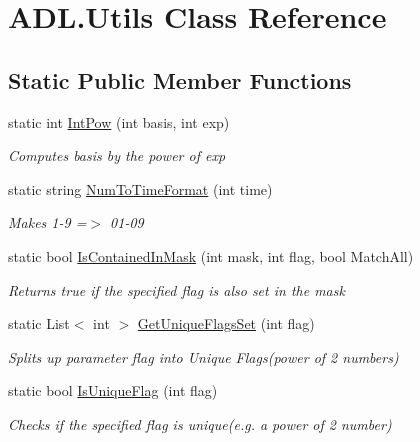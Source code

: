 \hypertarget{class_a_d_l_1_1_utils}{}\section{A\+D\+L.\+Utils Class Reference}
\label{class_a_d_l_1_1_utils}
\subsection*{Static Public Member Functions}
\begin{DoxyCompactItemize}
\item 
static int \mbox{\hyperlink{class_a_d_l_1_1_utils_ac921cfeea8d73d9ac4298802e2594504}{Int\+Pow}} (int basis, int exp)
\begin{DoxyCompactList}\small\item\em Computes basis by the power of exp \end{DoxyCompactList}\item 
static string \mbox{\hyperlink{class_a_d_l_1_1_utils_a7f8a756ce7c6c8d4cfe7126ef534e151}{Num\+To\+Time\+Format}} (int time)
\begin{DoxyCompactList}\small\item\em Makes 1-\/9 =$>$ 01-\/09 \end{DoxyCompactList}\item 
static bool \mbox{\hyperlink{class_a_d_l_1_1_utils_a79e826c30b25ade59b2bdd5f4b71dc1b}{Is\+Contained\+In\+Mask}} (int mask, int flag, bool Match\+All)
\begin{DoxyCompactList}\small\item\em Returns true if the specified flag is also set in the mask \end{DoxyCompactList}\item 
static List$<$ int $>$ \mbox{\hyperlink{class_a_d_l_1_1_utils_afdadf33d3a7626d82a239f750d12f076}{Get\+Unique\+Flags\+Set}} (int flag)
\begin{DoxyCompactList}\small\item\em Splits up parameter flag into Unique Flags(power of 2 numbers) \end{DoxyCompactList}\item 
static bool \mbox{\hyperlink{class_a_d_l_1_1_utils_a126953fb363a954a2e9a761700604ecf}{Is\+Unique\+Flag}} (int flag)
\begin{DoxyCompactList}\small\item\em Checks if the specified flag is unique(e.\+g. a power of 2 number) \end{DoxyCompactList}\item 

\end{DoxyCompactItemize}
